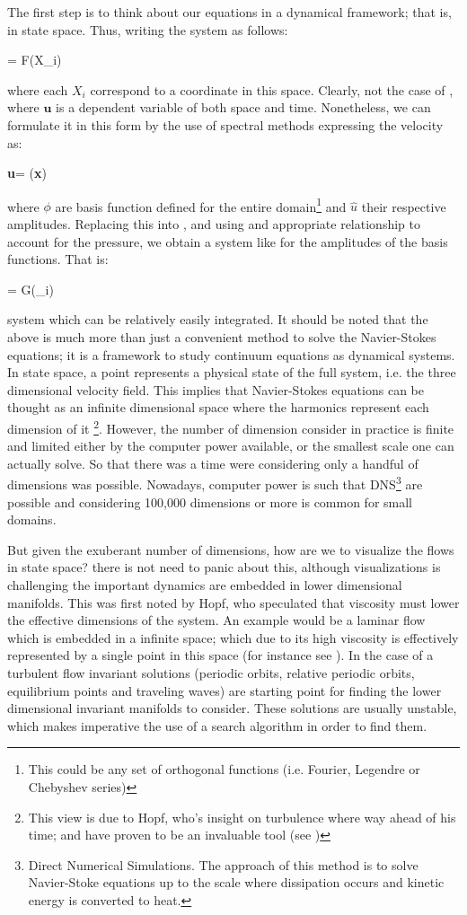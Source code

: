 The first step is to think about our equations in a dynamical framework; that is, in state space. Thus, writing the system as follows:

\beq
{} = F(X_i)

 where each $X_i$ correspond to a coordinate in this space. Clearly, not the case of , where $\textbf{u}$ is a dependent variable of both space and time. Nonetheless, we can formulate it in this form by the use of spectral methods expressing the velocity as:

 \beq
\textbf{u}=\sum {} \phi (\textbf{x})

 where $\phi$ are basis function defined for the entire domain\footnote{This could be any set of orthogonal functions (i.e. Fourier, Legendre or Chebyshev series)} and $\widehat{u}$ their respective amplitudes. Replacing this into , and using and appropriate relationship to account for the pressure, we obtain a system like  for the amplitudes of the basis functions. That is:

\beq
{} = G(_i)

system which can be relatively easily integrated. It should be noted that the above is much more than just a convenient method to solve the Navier-Stokes equations; it is a framework to study continuum equations as dynamical systems. In state space, a point represents a physical state of the full system, i.e. the three dimensional velocity field. This implies that Navier-Stokes equations can be thought as an infinite dimensional space where the harmonics represent each dimension of it \footnote{This view is due to Hopf, who's insight on turbulence where way ahead of his time; and have proven to be an invaluable tool (see )}. However, the number of dimension consider in practice is finite and limited either by the computer power available, or the smallest scale one can actually solve. So that there was a time were considering only a handful of dimensions was possible. Nowadays, computer power is such that DNS\footnote{Direct Numerical Simulations. The approach of this method is to solve Navier-Stoke equations up to the scale where dissipation occurs and kinetic energy is converted to heat.} are possible and considering 100,000 dimensions or more is common for small domains.

But given the exuberant number of dimensions, how are we to visualize the flows in state space? there is not need to panic about this, although visualizations is challenging the important dynamics are embedded in lower dimensional manifolds. This was first noted by Hopf, who speculated that viscosity must lower the effective dimensions of the system. An example would be a laminar flow which is embedded in a infinite space; which due to its high viscosity is effectively represented by a single point in this space (for instance see ). In the case of a turbulent flow invariant solutions (periodic orbits, relative periodic orbits, equilibrium points and traveling waves) are starting point for finding the lower dimensional invariant manifolds to consider. These solutions are usually unstable, which makes imperative the use of a search algorithm in order to find them.

